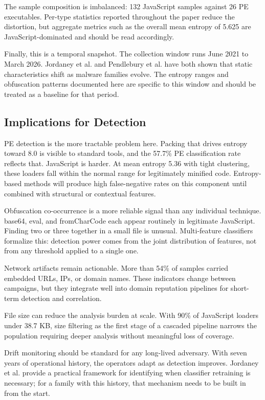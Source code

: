 \documentclass[pdflatex,sn-mathphys-num]{sn-jnl}
\theoremstyle{thmstyleone}%
\theoremstyle{thmstyletwo}%
\theoremstyle{thmstylethree}%
\begin{document}
The sample composition is imbalanced: 132 JavaScript samples against 26 PE executables. Per-type statistics reported throughout the paper reduce the distortion, but aggregate metrics such as the overall mean entropy of 5.625 are JavaScript-dominated and should be read accordingly.

Finally, this is a temporal snapshot. The collection window runs June 2021 to March 2026. Jordaney et al. \cite{jordaney2017} and Pendlebury et al. \cite{pendlebury2019} have both shown that static characteristics shift as malware families evolve. The entropy ranges and obfuscation patterns documented here are specific to this window and should be treated as a baseline for that period.

\subsection{Implications for Detection}\label{subsec:detection_implications}

PE detection is the more tractable problem here. Packing that drives entropy toward 8.0 is visible to standard tools, and the 57.7\% PE classification rate reflects that. JavaScript is harder. At mean entropy 5.36 with tight clustering, these loaders fall within the normal range for legitimately minified code. Entropy-based methods will produce high false-negative rates on this component until combined with structural or contextual features.

Obfuscation co-occurrence is a more reliable signal than any individual technique. base64, eval, and fromCharCode each appear routinely in legitimate JavaScript. Finding two or three together in a small file is unusual. Multi-feature classifiers \cite{arp2014} formalize this: detection power comes from the joint distribution of features, not from any threshold applied to a single one.

Network artifacts remain actionable. More than 54\% of samples carried embedded URLs, IPs, or domain names. These indicators change between campaigns, but they integrate well into domain reputation pipelines \cite{rahbarinia2015} for short-term detection and correlation.

File size can reduce the analysis burden at scale. With 90\% of JavaScript loaders under 38.7 KB, size filtering as the first stage of a cascaded pipeline \cite{fass2018} narrows the population requiring deeper analysis without meaningful loss of coverage.

Drift monitoring should be standard for any long-lived adversary. With seven years of operational history, the operators adapt as detection improves. Jordaney et al. \cite{jordaney2017} provide a practical framework for identifying when classifier retraining is necessary; for a family with this history, that mechanism needs to be built in from the start.
\end{document}
